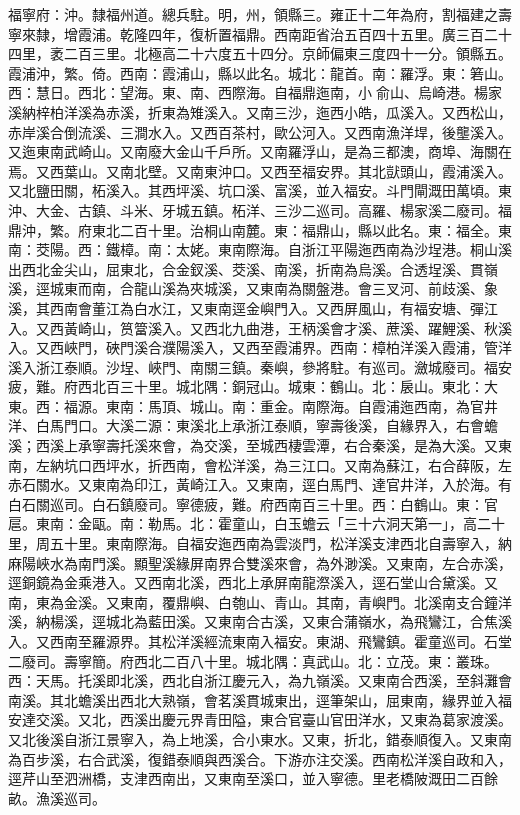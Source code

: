 \begin{pinyinscope}
福寧府：沖。隸福州道。總兵駐。明，州，領縣三。雍正十二年為府，割福建之壽寧來隸，增霞浦。乾隆四年，復析置福鼎。西南距省治五百四十五里。廣三百二十四里，袤二百三里。北極高二十六度五十四分。京師偏東三度四十一分。領縣五。霞浦沖，繁。倚。西南：霞浦山，縣以此名。城北：龍首。南：羅浮。東：箬山。西：慧日。西北：望海。東、南、西際海。自福鼎迤南，小俞山、烏崎港。楊家溪納梓柏洋溪為赤溪，折東為雉溪入。又南三沙，迤西小皓，瓜溪入。又西松山，赤岸溪合倒流溪、三澗水入。又西百茶村，歐公河入。又西南漁洋垾，後壟溪入。又迤東南武崎山。又南廢大金山千戶所。又南羅浮山，是為三都澳，商埠、海關在焉。又西葉山。又南北壁。又南東沖口。又西至福安界。其北獃頭山，霞浦溪入。又北鹽田關，柘溪入。其西坪溪、坑口溪、富溪，並入福安。斗門閘溉田萬頃。東沖、大金、古鎮、斗米、牙城五鎮。柘洋、三沙二巡司。高羅、楊家溪二廢司。福鼎沖，繁。府東北二百十里。治桐山南麓。東：福鼎山，縣以此名。東：福全。東南：茭陽。西：鐵樟。南：太姥。東南際海。自浙江平陽迤西南為沙埕港。桐山溪出西北金尖山，屈東北，合金釵溪、茭溪、南溪，折南為烏溪。合透埕溪、貫嶺溪，逕城東而南，合龍山溪為夾城溪，又東南為關盤港。會三叉河、前歧溪、象溪，其西南會董江為白水江，又東南逕金嶼門入。又西屏風山，有福安塘、彈江入。又西黃崎山，筼簹溪入。又西北九曲港，王柄溪會才溪、蔗溪、躍鯉溪、秋溪入。又西峽門，硤門溪合濮陽溪入，又西至霞浦界。西南：樟柏洋溪入霞浦，管洋溪入浙江泰順。沙埕、峽門、南關三鎮。秦嶼，參將駐。有巡司。瀲城廢司。福安疲，難。府西北百三十里。城北隅：銅冠山。城東：鶴山。北：扆山。東北：大東。西：福源。東南：馬頂、城山。南：重金。南際海。自霞浦迤西南，為官井洋、白馬門口。大溪二源：東溪北上承浙江泰順，寧壽後溪，自緣界入，右會蟾溪；西溪上承寧壽托溪來會，為交溪，至城西棲雲潭，右合秦溪，是為大溪。又東南，左納坑口西坪水，折西南，會松洋溪，為三江口。又南為蘇江，右合薛阪，左赤石關水。又東南為印江，黃崎江入。又東南，逕白馬門、達官井洋，入於海。有白石關巡司。白石鎮廢司。寧德疲，難。府西南百三十里。西：白鶴山。東：官扈。東南：金甌。南：勒馬。北：霍童山，白玉蟾云「三十六洞天第一」，高二十里，周五十里。東南際海。自福安迤西南為雲淡門，松洋溪支津西北自壽寧入，納麻陽峽水為南門溪。顯聖溪緣屏南界合雙溪來會，為外渺溪。又東南，左合赤溪，逕銅鏡為金乘港入。又西南北溪，西北上承屏南龍漈溪入，逕石堂山合黛溪。又南，東為金溪。又東南，覆鼎嶼、白匏山、青山。其南，青嶼門。北溪南支合鐘洋溪，納楊溪，逕城北為藍田溪。又東南合古溪，又東合蒲嶺水，為飛鸞江，合焦溪入。又西南至羅源界。其松洋溪經流東南入福安。東湖、飛鸞鎮。霍童巡司。石堂二廢司。壽寧簡。府西北二百八十里。城北隅：真武山。北：立茂。東：叢珠。西：天馬。托溪即北溪，西北自浙江慶元入，為九嶺溪。又東南合西溪，至斜灘會南溪。其北蟾溪出西北大熟嶺，會茗溪貫城東出，逕筆架山，屈東南，緣界並入福安達交溪。又北，西溪出慶元界青田隘，東合官臺山官田洋水，又東為葛家渡溪。又北後溪自浙江景寧入，為上地溪，合小東水。又東，折北，錯泰順復入。又東南為百步溪，右合武溪，復錯泰順與西溪合。下游亦注交溪。西南松洋溪自政和入，逕芹山至泗洲橋，支津西南出，又東南至溪口，並入寧德。里老橋陂溉田二百餘畝。漁溪巡司。


\end{pinyinscope}
